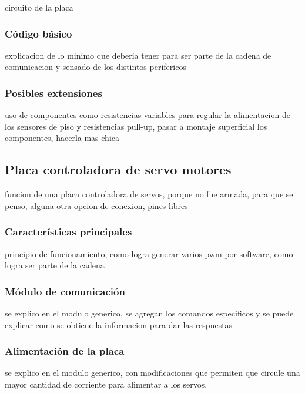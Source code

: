 circuito de la placa

\subsubsection{C\'odigo b\'asico}
\label{}

explicacion de lo minimo que deberia tener para ser parte de la cadena de comunicacion y sensado de los distintos perifericos

\subsubsection{Posibles extensiones}
\label{}

uso de componentes como resistencias variables para regular la alimentacion de los sensores de piso y resistencias pull-up, pasar a montaje superficial los componentes, hacerla mas chica

\subsection{Placa controladora de servo motores}
\label{}

funcion de una placa controladora de servos, porque no fue armada, para que se penso, alguna otra opcion de conexion, pines libres

\subsubsection{Caracter\'isticas principales}
\label{}

principio de funcionamiento, como logra generar varios pwm por software, como logra ser parte de la cadena

\subsubsection{M\'odulo de comunicaci\'on}
\label{}

se explico en el modulo generico, se agregan los comandos especificos y se puede explicar como se obtiene la informacion para dar las respuestas

\subsubsection{Alimentaci\'on de la placa}
\label{}

se explico en el modulo generico, con modificaciones que permiten que circule una mayor cantidad de corriente para alimentar a los servos.

